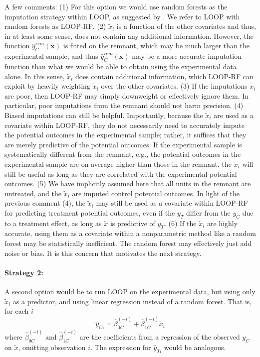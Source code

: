 A few comments:
(1) For this option we would use random forests as the imputation strategy within LOOP, as suggested by \cite{loop}.  We refer to LOOP with random forests as LOOP-RF.
(2) $\tilde{x}_{i}$ is a function of the other covariates and thus, in at least some sense, does not contain any additional information.  However, the function $\hat{y}_C^{rem}(\mathbf{x})$  is fitted on the remnant, which may be much larger than the experimental sample, and thus $\hat{y}_C^{rem}(\mathbf{x})$ may be a more accurate imputation function than what we would be able to obtain using the experimental data alone.  In this sense, $\tilde{x}_{i}$ does contain additional information, which LOOP-RF can exploit by heavily weighting $\tilde{x}_{i}$ over the other covariates.
(3) If the imputations $\tilde{x}_{i}$ are poor, then LOOP-RF may simply downweight or effectively ignore them.  In particular, poor imputations from the remnant should not harm precision.
(4) Biased imputations can still be helpful.  Importantly, because the $\tilde{x}_{i}$ are used as a covariate within LOOP-RF, they do not necessarily need to accurately impute the potential outcomes in the experimental sample; rather, it suffices that they are merely predictive of the potential outcomes.  If the experimental sample is systematically different from the remnant,  e.g., the potential outcomes in the experimental sample are on average higher than those in the remnant, the $\tilde{x}_{i}$ will still be useful as long as they are correlated with the experimental potential outcomes.
(5) We have implicitly assumed here that all units in the remnant are untreated, and the $\tilde{x}_{i}$ are imputed control potential outcomes.  In light of the previous comment (4), the $\tilde{x}_{i}$ may still be used as a covariate within LOOP-RF for predicting treatment potential outcomes, even if the $y_T$ differ from the $y_C$ due to a treatment effect, as long as $\tilde{x}$ is predictive of $y_T$.
(6) If the $\tilde{x}_{i}$ are highly accurate, using them as a covariate within a nonparametric method like a random forest may be statistically inefficient.  The random forest may effectively just add noise or bias.  It is this concern that motivates the next strategy.

\paragraph{Strategy 2:}
A second option would be to run LOOP on the experimental data, but using only $\tilde{x}_{i}$ as a predictor, and using linear regression instead of a random forest.  That is, for each $i$
\begin{equation}
\hat{y}_{Ci} = \hat{\beta}_{0C}^{(-i)} + \hat{\beta}_{1C}^{(-i)}\tilde{x}_{i}
\end{equation}
where  $\hat{\beta}_{0C}^{(-i)}$ and $\hat{\beta}_{1C}^{(-i)}$ are the coefficients from a regression of the observed $y_C$ on $\tilde{x}$, omitting observation $i$.  The expression for $\hat{y}_{Ti}$ would be analogous.


